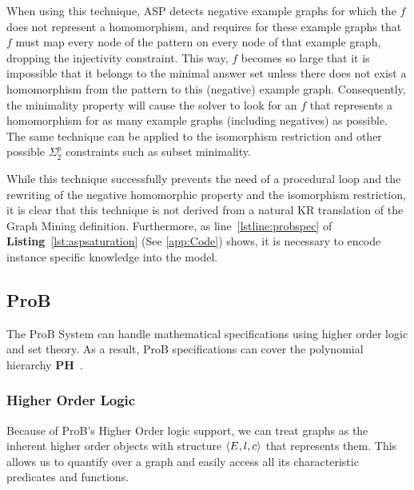 When using this technique, ASP detects negative example graphs for which the $f$ does not represent a homomorphism, and requires for these example graphs that $f$ must map every node of the pattern on every node of that example graph, dropping the injectivity constraint.
This way, $f$ becomes so large that it is impossible that it belongs to the minimal answer set unless there does not exist a homomorphism from the pattern to this (negative) example graph.
Consequently, the minimality property will cause the solver to look for an $f$ that represents a homomorphism for as many example graphs (including negatives) as possible.
The same technique can be applied to the isomorphism restriction and other possible $\Sigma_{2}^{p}$ constraints such as subset minimality.


While this technique successfully prevents the need of a procedural loop and the rewriting of the negative homomorphic property and the isomorphism restriction, it is clear that this technique is not derived from a natural KR translation of the Graph Mining definition.
Furthermore, as line~\ref{lstline:probspec} of \textbf{Listing}~\ref{lst:aspsaturation} (See \ref{app:Code}) shows, it is necessary to encode instance specific knowledge into the model.

\subsection{ProB} \label{subsection:prob}
The ProB System can handle mathematical specifications using higher order logic and set theory.
As a result, ProB specifications can cover the polynomial hierarchy \textbf{PH}~\citep{DBLP:books/daglib/0095988}.

\subsubsection{Higher Order Logic}
Because of ProB's Higher Order logic support, we can treat graphs as the inherent higher order objects with structure $\langle E,l,c \rangle$ that represents them.
This allows us to quantify over a graph and easily access all its characteristic predicates and functions.

